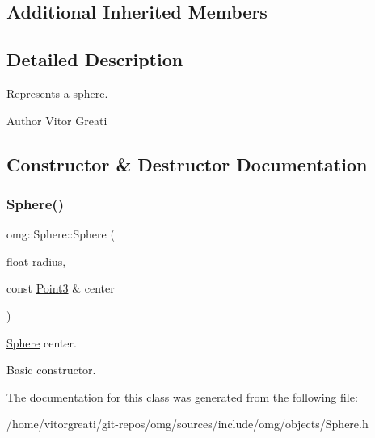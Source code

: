 \subsection*{Additional Inherited Members}


\subsection{Detailed Description}
Represents a sphere. 

\begin{DoxyAuthor}{Author}
Vitor Greati 
\end{DoxyAuthor}


\subsection{Constructor \& Destructor Documentation}
\mbox{\label{classomg_1_1_sphere_a81f9a5180b9c883ce00669d4af4d38db}} 
\subsubsection{\texorpdfstring{Sphere()}{Sphere()}}
{\footnotesize\ttfamily omg\+::\+Sphere\+::\+Sphere (\begin{DoxyParamCaption}\item[{float}]{radius,  }\item[{const \mbox{\hyperlink{namespaceomg_af85242d35fdacf829d32a6f9b95f3e35}{Point3}} \&}]{center }\end{DoxyParamCaption})\hspace{0.3cm}{\ttfamily [inline]}}



\mbox{\hyperlink{classomg_1_1_sphere}{Sphere}} center. 

Basic constructor. 

The documentation for this class was generated from the following file\+:\begin{DoxyCompactItemize}
\item 
/home/vitorgreati/git-\/repos/omg/sources/include/omg/objects/Sphere.\+h\end{DoxyCompactItemize}
